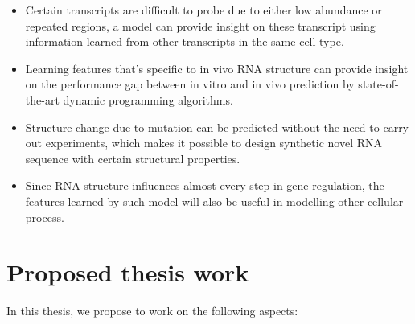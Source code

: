 \documentclass{proposal}
\begin{document}
\begin{itemize}
    \item Certain transcripts are difficult to probe due to either low abundance or repeated regions,
        a model can provide insight on these transcript using information learned from other transcripts in the same cell type.
    \item Learning features that's specific to in vivo RNA structure can provide
        insight on the performance gap between in vitro and in vivo prediction by state-of-the-art dynamic programming algorithms.
    \item Structure change due to mutation can be predicted without the need to carry out experiments,
        which makes it possible to design synthetic novel RNA sequence with certain structural properties.
    \item Since RNA structure influences almost every step in gene regulation,
        the features learned by such model will also be useful in modelling other cellular process.
\end{itemize}


\section{Proposed thesis work}

In this thesis, we propose to work on the following aspects:
\end{document}
